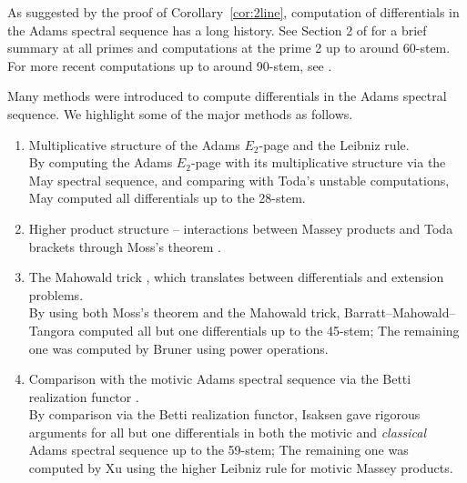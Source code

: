 As suggested by the proof of Corollary~\ref{cor:2line}, computation of differentials in the Adams spectral sequence has a long history. See Section 2 of \cite{WX61} for a brief summary at all primes and computations at the prime 2 up to around 60-stem. For more recent computations up to around 90-stem, see \cite{IWX, IWXsurvey, WXems, WXicm}.

Many methods were introduced to compute differentials in the Adams spectral sequence. We highlight some of the major methods as follows.
\begin{enumerate}
    \item Multiplicative structure of the Adams $E_2$-page and the Leibniz rule. \\
    
     \noindent By computing the Adams $E_2$-page with its multiplicative structure via the May spectral sequence, and comparing with Toda's unstable computations, May \cite{Maythesis} computed all differentials up to the 28-stem.\\
    
    \item Higher product structure -- interactions between Massey products and Toda brackets through Moss's theorem \cite{Moss}.\\

    \item The Mahowald trick \cite{MahowaldTangora}, which translates between differentials and extension problems.\\

    \noindent By using both Moss's theorem and the Mahowald trick, Barratt--Mahowald--Tangora \cite{MahowaldTangora, BarrattMahowaldTangora} computed all but one differentials up to the 45-stem; The remaining one was computed by Bruner \cite{Brunerdiff} using power operations.\\

    \item Comparison with the motivic Adams spectral sequence via the Betti realization functor \cite{DuggerIsaksen}.\\

    \noindent By comparison via the Betti realization functor, Isaksen \cite{Isaksen} gave rigorous arguments for all but one differentials in both the motivic and \emph{classical} Adams spectral sequence up to the 59-stem; The remaining one was computed by Xu \cite{IsaksenXu} using the higher Leibniz rule for motivic Massey products. \\


\end{enumerate}
